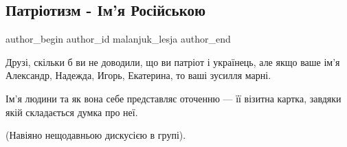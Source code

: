  
 
 
 
 
 
\subsection{Патріотизм - Ім'я Російською}
\label{sec:12_10_2019.fb.malanjuk_lesja.1.patriotizm_imja_jazyk}
 
\ifcmt
 author_begin
   author_id malanjuk_lesja
 author_end
\fi

Друзі, скільки б ви не доводили, що ви патріот і українець, але якщо ваше ім'я
Александр, Надежда, Игорь, Екатерина, то ваші зусилля марні.

Ім'я людини та як вона себе представляє оточенню — її візитна картка, завдяки
якій складається думка про неї.

(Навіяно нещодавньою дискусією в групі).


